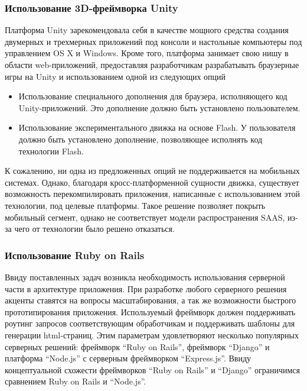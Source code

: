 \documentclass[12pt, a4paper]{article}
\begin{document}
\subsubsection{Использование 3D-фреймворка Unity}

Платформа Unity зарекомендовала себя в качестве мощного средства создания
двумерных и трехмерных приложений под консоли и настольные компьютеры под
управлением OS X и Windows. Кроме того, платформа занимает свою нишу в области
web-приложений, предоставляя разработчикам разрабатывать браузерные игры на
Unity и использованием одной из следующих опций

\begin{itemize}
    \item Использование специального дополнения для браузера, исполняющего код
    Unity-приложений. Это дополнение должно быть установлено пользователем.
    \item Использование экспериментального движка на основе Flash. У
    пользователя должно быть установлено дополнение, позволяющее исполнять код
    технологии Flash.
\end{itemize}

К сожалению, ни одна из предложенных опций не поддерживается на мобильных
системах. Однако, благодаря кросс-платформенной сущности движка, существует
возможность перекомпилировать приложения, написанные с использованием этой
технологии, под целевые платформы. Такое решение позволяет покрыть мобильный
сегмент, однако не соответствует модели распространения SAAS, из-за чего от
технологии было решено отказаться.

\subsubsection{Использование Ruby on Rails}

Ввиду поставленных задач возникла необходимость использования серверной части в
архитектуре приложения. При разработке любого серверного решения
акценты ставятся на вопросы масштабирования, а так же возможности быстрого
прототипирования приложения. Используемый фреймворк должен
поддерживать роутинг запросов соответствующим обработчикам и поддерживать
шаблоны для генерации html-страниц. Этим параметрам удовлетворяют
несколько популярных серверных решений: фреймворк ``Ruby on Rails'', фреймворк
``Django'' и платформа ``Node.js'' с серверным фреймворком ``Express.js''. Ввиду
концептуальной схожести фреймворков ``Ruby on Rails'' и ``Django'' ограничимся сравнением Ruby on Rails и ``Node.js''.
\end{document}
